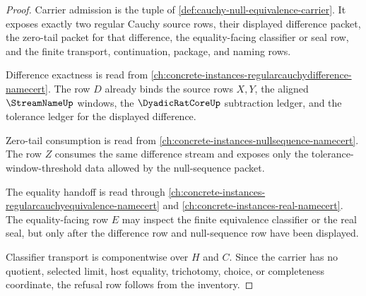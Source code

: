 \begin{proof}
Carrier admission is the tuple of \autoref{def:cauchy-null-equivalence-carrier}. It exposes exactly two regular Cauchy source rows, their displayed difference packet, the zero-tail packet for that difference, the equality-facing classifier or seal row, and the finite transport, continuation, package, and naming rows.

Difference exactness is read from \autoref{ch:concrete-instances-regularcauchydifference-namecert}. The row $D$ already binds the source rows $X,Y$, the aligned $\StreamNameUp$ windows, the $\DyadicRatCoreUp$ subtraction ledger, and the tolerance ledger for the displayed difference.

Zero-tail consumption is read from \autoref{ch:concrete-instances-nullsequence-namecert}. The row $Z$ consumes the same difference stream and exposes only the tolerance-window-threshold data allowed by the null-sequence packet.

The equality handoff is read through \autoref{ch:concrete-instances-regularcauchyequivalence-namecert} and \autoref{ch:concrete-instances-real-namecert}. The equality-facing row $E$ may inspect the finite equivalence classifier or the real seal, but only after the difference row and null-sequence row have been displayed.

Classifier transport is componentwise over $H$ and $C$. Since the carrier has no quotient, selected limit, host equality, trichotomy, choice, or completeness coordinate, the refusal row follows from the inventory.
\end{proof}

